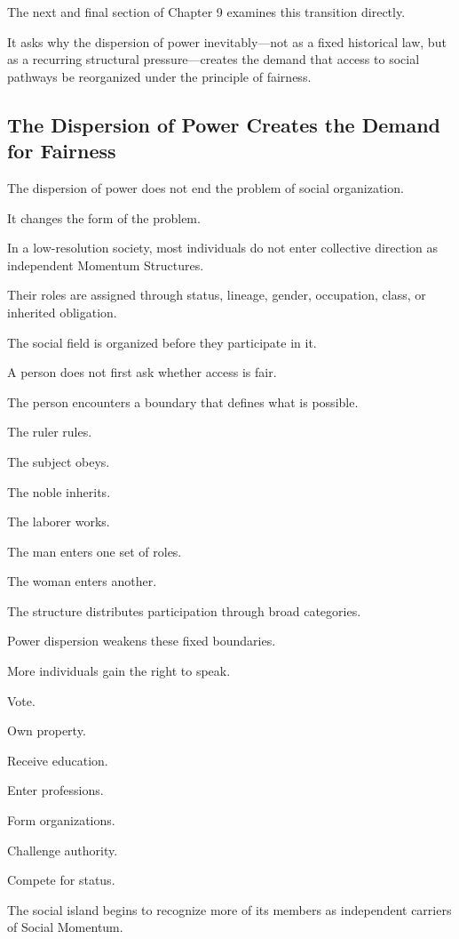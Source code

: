 The next and final section of Chapter 9 examines this transition directly.

It asks why the dispersion of power inevitably—not as a fixed historical law, but as a recurring structural pressure—creates the demand that access to social pathways be reorganized under the principle of fairness.

\subsection*{\textbf{The Dispersion of Power Creates the Demand for Fairness}}


The dispersion of power does not end the problem of social organization.

It changes the form of the problem.

In a low-resolution society, most individuals do not enter collective direction as independent Momentum Structures.

Their roles are assigned through status, lineage, gender, occupation, class, or inherited obligation.

The social field is organized before they participate in it.

A person does not first ask whether access is fair.

The person encounters a boundary that defines what is possible.

The ruler rules.

The subject obeys.

The noble inherits.

The laborer works.

The man enters one set of roles.

The woman enters another.

The structure distributes participation through broad categories.

Power dispersion weakens these fixed boundaries.

More individuals gain the right to speak.

Vote.

Own property.

Receive education.

Enter professions.

Form organizations.

Challenge authority.

Compete for status.

The social island begins to recognize more of its members as independent carriers of Social Momentum.

